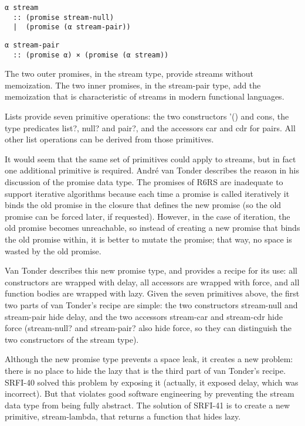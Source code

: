 \begin{verbatim}
α stream
  :: (promise stream-null)
  |  (promise (α stream-pair))
\end{verbatim}

\begin{verbatim}
α stream-pair
  :: (promise α) × (promise (α stream))
\end{verbatim}

The two outer promises, in the stream type, provide streams without
memoization. The two inner promises, in the stream-pair type, add the
memoization that is characteristic of streams in modern functional
languages.

Lists provide seven primitive operations: the two constructors '() and
cons, the type predicates list?, null? and pair?, and the accessors car
and cdr for pairs. All other list operations can be derived from those
primitives.

It would seem that the same set of primitives could apply to streams,
but in fact one additional primitive is required. André van Tonder
describes the reason in his discussion of the promise data type. The
promises of R6RS are inadequate to support iterative algorithms because
each time a promise is called iteratively it binds the old promise in
the closure that defines the new promise (so the old promise can be
forced later, if requested). However, in the case of iteration, the old
promise becomes unreachable, so instead of creating a new promise that
binds the old promise within, it is better to mutate the promise; that
way, no space is wasted by the old promise.

Van Tonder describes this new promise type, and provides a recipe for
its use: all constructors are wrapped with delay, all accessors are
wrapped with force, and all function bodies are wrapped with lazy. Given
the seven primitives above, the first two parts of van Tonder's recipe
are simple: the two constructors stream-null and stream-pair hide delay,
and the two accessors stream-car and stream-cdr hide force (stream-null?
and stream-pair? also hide force, so they can distinguish the two
constructors of the stream type).

Although the new promise type prevents a space leak, it creates a new
problem: there is no place to hide the lazy that is the third part of
van Tonder's recipe. SRFI-40 solved this problem by exposing it
(actually, it exposed delay, which was incorrect). But that violates
good software engineering by preventing the stream data type from being
fully abstract. The solution of SRFI-41 is to create a new primitive,
stream-lambda, that returns a function that hides lazy.

